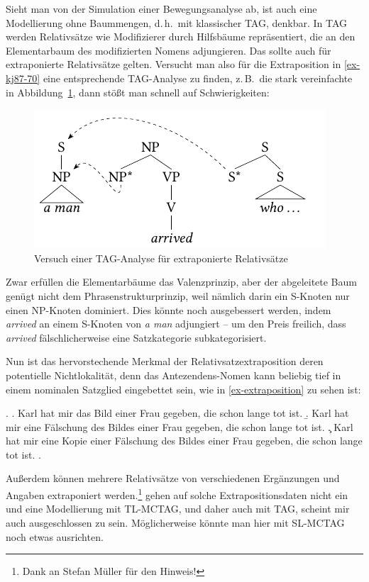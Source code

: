 Sieht man von der Simulation einer Bewegungsanalyse ab, ist auch eine Modellierung ohne Baummengen, d.\,h.\ mit klassischer TAG, denkbar. In TAG werden Relativsätze wie Modifizierer durch Hilfsbäume repräsentiert, die an den Elementarbaum des modifizierten Nomens adjungieren. Das sollte auch für extraponierte Relativsätze gelten. Versucht man also für die Extraposition in \ref{ex-kj87-70} eine entsprechende TAG-Analyse zu finden, z.\,B.\ die stark vereinfachte in Abbildung~\ref{fig-extraposition-1}, dann stö\ss t man schnell auf Schwierigkeiten:  
\begin{figure}[t]
\centering
\includegraphics{graphics/abb518.pdf}
\caption{\label{fig-extraposition-1}Versuch einer TAG-Analyse für extraponierte Relativsätze}
\end{figure}
Zwar erfüllen die Elementarbäume das Valenzprinzip, aber der abgeleitete Baum genügt nicht dem Phrasenstrukturprinzip, weil nämlich darin ein S-Knoten nur einen NP-Knoten dominiert. Dies könnte noch ausgebessert werden, indem {\it arrived} an einem S-Knoten von {\it a man} adjungiert -- um den Preis freilich, dass {\it arrived} fälschlicherweise eine Satzkategorie subkategorisiert. 

Nun ist das hervorstechende Merkmal der Relativsatzextraposition deren potentielle Nichtlokalität, denn das Antezendens-Nomen kann beliebig tief in einem nominalen Satzglied eingebettet sein, wie in \ref{ex-extraposition} zu sehen ist:

\ex. \label{ex-extraposition}
\a. Karl hat mir das Bild einer Frau gegeben, die schon lange tot ist.
\b. Karl hat mir eine Fälschung des Bildes einer Frau gegeben, die schon lange tot ist.
\c. Karl hat mir eine Kopie einer Fälschung des Bildes einer Frau gegeben, die schon lange tot ist.
\z. \citep[(13.18)]{Mueller:99}

Au\ss erdem können mehrere Relativsätze von verschiedenen Ergänzungen und Angaben extraponiert werden.\footnote{Dank an Stefan Müller für den Hinweis!} \cite{Kroch:Joshi:87} gehen auf solche Extrapositionsdaten nicht ein und eine Modellierung mit TL-MCTAG, und daher auch mit TAG, scheint mir auch ausgeschlossen zu sein. Möglicherweise könnte man hier mit SL-MCTAG noch etwas ausrichten. %


